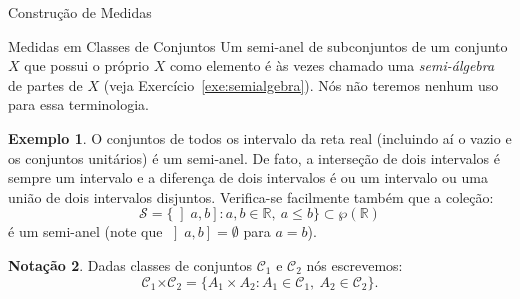 \documentclass[oneside,final,11pt]{amsbook}
\newcommand{\R}{\mathds R}
\newcommand{\Times}{\pmb{\times}}
\theoremstyle{remark}\newtheorem{exercise}{Exercício}[chapter]
\theoremstyle{remark}\newtheorem{*exercise}[exercise]{\hbox to 0pt{\hskip 0pt minus 1fil*}Exercício}
\theoremstyle{definition}\newtheorem{exdefin}{Definição}[chapter]
\theoremstyle{plain}\newtheorem{teo}{Teorema}[section]
\theoremstyle{plain}\newtheorem{lem}[teo]{Lema}
\theoremstyle{plain}\newtheorem{prop}[teo]{Proposição}
\theoremstyle{plain}\newtheorem{cor}[teo]{Corolário}
\theoremstyle{definition}\newtheorem{defin}[teo]{Definição}
\theoremstyle{remark}\newtheorem{rem}[teo]{Observação}
\theoremstyle{definition}\newtheorem{notation}[teo]{Notação}
\theoremstyle{definition}\newtheorem{convention}[teo]{Convenção}
\theoremstyle{definition}\newtheorem{example}[teo]{Exemplo}
\numberwithin{section}{chapter}
\numberwithin{equation}{section}
\begin{document}
\begin{chapter}{Construção de Medidas}
\begin{section}{Medidas em Classes de Conjuntos}
Um semi-anel de subconjuntos de um conjunto $X$ que possui o próprio $X$ como elemento é às vezes chamado uma
{\em semi-álgebra\/} de partes de $X$ (veja Exercício~\ref{exe:semialgebra}). Nós não teremos nenhum uso para
essa terminologia.

\begin{example}
O conjuntos de todos os intervalo da reta real (incluindo aí o vazio e os conjuntos unitários) é um semi-anel.
De fato, a interseção de dois intervalos é sempre um intervalo e a diferença de dois intervalos é ou um intervalo
ou uma união de dois intervalos disjuntos. Verifica-se facilmente também que a coleção:
\begin{equation}\label{eq:semiintervalos}
\mathcal S=\big\{\left]a,b\right]:a,b\in\R,\ a\le b\big\}\subset\wp(\R)
\end{equation}
é um semi-anel (note que $\left]a,b\right]=\emptyset$ para $a=b$).
\end{example}

\begin{notation}
Dadas classes de conjuntos $\mathcal C_1$ e $\mathcal C_2$ nós escrevemos:\index[simbolos]{$\mathcal C_1\Times\mathcal C_2$}
\[\mathcal C_1\Times\mathcal C_2=\big\{A_1\times A_2:A_1\in\mathcal C_1,\ A_2\in\mathcal C_2\big\}.\]
\end{notation}


\end{section}
\end{chapter}
\end{document}
